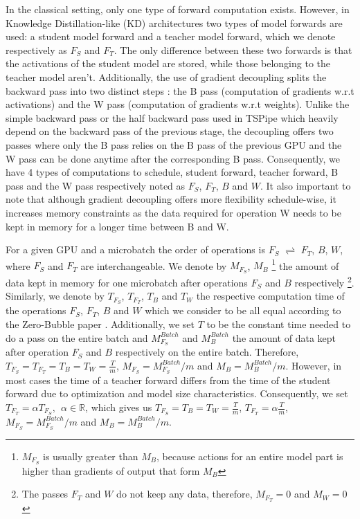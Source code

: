 \documentclass{article}
\begin{document}
In the classical setting, only one type of forward computation exists. However, in Knowledge Distillation-like (KD) architectures two types of model forwards are used: a student model forward and a teacher model forward, which we denote respectively as $F_S$ and $F_T$. The only difference between these two forwards is that the activations of the student model are stored, while those belonging to the teacher model aren't. Additionally, the use of gradient decoupling splits the backward pass into two distinct steps : the B pass (computation of gradients w.r.t activations) and the W pass (computation of gradients w.r.t weights). Unlike the simple backward pass or the half backward pass used in TSPipe \cite{} which heavily depend on the backward pass of the previous stage, the decoupling offers two passes where only the B pass relies on the B pass of the previous GPU and the W pass can be done anytime after the corresponding B pass. Consequently, we have 4 types of computations to schedule, student forward, teacher forward, B pass and the W pass respectively noted as $F_S$, $F_T$, $B$ and $W$. It also important to note that although gradient decoupling offers more flexibility schedule-wise, it increases memory constraints as  the data required for operation W needs to be kept in memory for a longer time between B and W.


For a given GPU and a microbatch the order of operations is $F_S$ $\rightleftharpoons$ $F_T$, $B$, $W$, where $F_S$ and $F_T$ are interchangeable. We denote by $M_{F_S}$, $M_B$ \footnote{$M_{F_S}$ is usually greater than $M_B$, because actions for an entire model part is higher than gradients of output that form $M_B$} the amount of data kept in memory for one microbatch after operations $F_S$ and $B$ respectively \footnote{The passes $F_T$ and $W$ do not keep any data, therefore, $M_{F_T}=0$ and $M_W=0$}. Similarly, we denote by $T_{F_S}$, $T_{F_T}$, $T_B$ and $T_W$ the respective computation time of the operations $F_S$, $F_T$, $B$ and $W$ which we consider to be all equal according to the Zero-Bubble paper \cite{}. Additionally, we set $T$ to be the constant time needed to do a pass on the entire batch and $M_{F_S}^{Batch}$ and $M_B^{Batch}$ the amount of data kept after operation $F_S$ and $B$ respectively on the entire batch. Therefore, $T_{F_S}=T_{F_T}=T_B=T_W=\frac{T}{m}$, $M_{F_S}=M_{F_S}^{Batch}/m$ and $M_B=M_B^{Batch}/m$. However, in most cases the time of a teacher forward differs from the time of the student forward due to optimization and model size characteristics. Consequently, we set $T_{F_T} = \alpha T_{F_S},~~\alpha \in \mathbb{R}$, which gives us $T_{F_S}=T_B=T_W=\frac{T}{m}$, $T_{F_T}=\alpha \frac{T}{m}$, $M_{F_S}=M_{F_S}^{Batch}/m$ and $M_B=M_B^{Batch}/m$.
\end{document}
